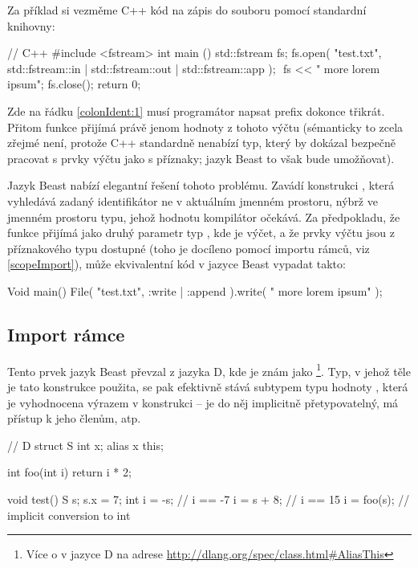 Za příklad si vezměme C++ kód na zápis do souboru pomocí standardní knihovny:
\begin{cppcode}
// C++
#include <fstream>
int main () {
	std::fstream fs;
	fs.open( "test.txt", std::fstream::in | std::fstream::out | std::fstream::app ); $\label{colonIdent:1}$
	fs << " more lorem ipsum";
	fs.close();
	return 0;
}
\end{cppcode}

Zde na řádku \ref{colonIdent:1} musí programátor napsat prefix  dokonce třikrát. Přitom funkce  přijímá právě jenom hodnoty z tohoto výčtu (sémanticky to zcela zřejmé není, protože C++ standardně nenabízí typ, který by dokázal bezpečně pracovat s prvky výčtu jako s příznaky; jazyk Beast to však bude umožňovat).

Jazyk Beast nabízí elegantní řešení tohoto problému. Zavádí konstrukci , která vyhledává zadaný identifikátor ne v aktuálním jmenném prostoru, nýbrž ve jmenném prostoru typu, jehož hodnotu kompilátor očekává. Za předpokladu, že funkce  přijímá jako druhý parametr typ , kde  je výčet, a že prvky výčtu jsou z příznakového typu dostupné (toho je docíleno pomocí importu rámců, viz \autoref{scopeImport}), může ekvivalentní kód v jazyce Beast vypadat takto:

\begin{code}
Void main() {
	File( "test.txt", :write | :append ).write( " more lorem ipsum" );
}
\end{code}

\subsection{Import rámce} \label{scopeImport}
Tento prvek jazyk Beast převzal z jazyka D, kde je znám jako \footnote{Více o  v jazyce D na adrese \url{http://dlang.org/spec/class.html\#AliasThis}}. Typ, v jehož těle je tato konstrukce použita, se pak efektivně stává subtypem typu hodnoty , která je vyhodnocena výrazem v konstrukci  -- je do něj implicitně přetypovatelný, má přístup k jeho členům, atp.

\begin{dcode}
// D
struct S
{
	int x;
	alias x this;
}

int foo(int i) { return i * 2; }

void test()
{
	S s;
	s.x = 7;
	int i = -s;  // i == -7
	i = s + 8;   // i == 15
	i = foo(s);  // implicit conversion to int
}
\end{dcode}

